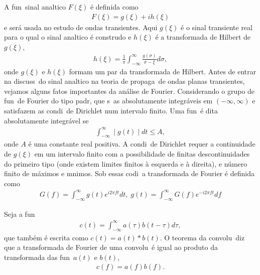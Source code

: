 A fun\cao\ sinal anal\ih tico $F(\xi)$ \'e definida como
\begin{eqnarray}
F(\xi) = g(\xi) + ih(\xi)
\end{eqnarray}
e ser\'a usada no estudo de ondas transientes. Aqui $g(\xi)$ \'e o
sinal transiente real para o qual o sinal anal\ih tico \'e
constru\ih do e $h(\xi)$ \'e a transformada de Hilbert de
$g(\xi)$,
\begin{eqnarray}
h(\xi) =
\frac{1}{\pi}\int_{-\infty}^{\infty}\frac{g(\sigma)}{\sigma-\xi}d\sigma,
\end{eqnarray}
onde $g(\xi)$ e $h(\xi)$ formam um par da transformada de Hilbert.
Antes de entrar na discuss\ao\ do sinal anal\ih tico na teoria de
propaga\cao\ de ondas planas transientes, vejamos alguns fatos
importantes da an\'alise de Fourier. Considerando o grupo de
fun\coes\ de Fourier do tipo padr\ao, que s\ao\ as absolutamente
integr\'aveis em $(-\infty,\infty)$ e satisfazem as condi\coes\ de
Dirichlet num intervalo finito. Uma fun\cao\ \'e dita
absolutamente integr\'avel se
\begin{eqnarray}
\int_{-\infty}^{\infty}\mid g(t)\mid dt \leq A,
\end{eqnarray}
onde $A$ \'e uma constante real positiva. A condi\cao\ de
Dirichlet requer a continuidade de $g(\xi)$ em um intervalo finito
com a possibilidade de finitas descontinuidades do primeiro tipo
(onde existem limites finitos \`a esquerda e \`a direita), e
n\'umero finito de m\'aximos e m\ih nimos. Sob essas codi\coes\ a
transformada de Fourier \'e definida como
\begin{eqnarray}
G(f) = \int_{-\infty}^{\infty}g(t)e^{i2\pi ft}dt,\; g(t) =
\int_{-\infty}^{\infty}G(f)e^{-i2\pi ft}df
\end{eqnarray}

Seja a fun\cao
\begin{eqnarray}
c(t) = \int_{-\infty}^{\infty} a(\tau)b(t-\tau)d\tau,
\end{eqnarray}
que tamb\'em \'e escrita como $c(t) = a(t)*b(t)$. O teorema da
convolu\cao\ diz que a transformada de Fourier de uma convolu\cao\
\'e igual ao produto da transformada das fun\coes\ $a(t)$ e
$b(t)$,
\begin{eqnarray}
c(f) = a(f)b(f).
\end{eqnarray}

